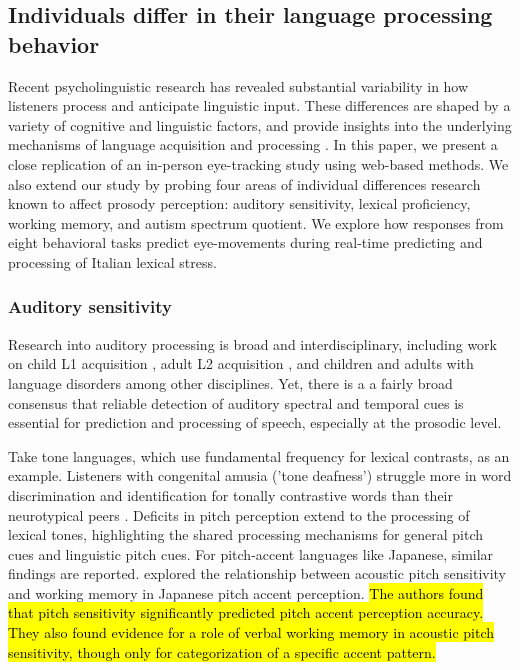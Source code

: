 \subsection{Individuals differ in their language processing behavior}

Recent psycholinguistic research has revealed substantial variability in how listeners process and anticipate linguistic input. These differences are shaped by a variety of cognitive and linguistic factors, and provide insights into the underlying mechanisms of language acquisition and processing \citep{Huettig2016, Li2023, Kidd2018}. In this paper, we present a close replication of an in-person eye-tracking study using web-based methods. We also extend our study by probing four areas of individual differences research known to affect prosody perception: auditory sensitivity, lexical proficiency, working memory, and autism spectrum quotient. We explore how responses from eight behavioral tasks predict eye-movements during real-time predicting and processing of Italian lexical stress.


\subsubsection{Auditory sensitivity}
Research into auditory processing is broad and interdisciplinary, including work on child L1 acquisition \citep{benasich2002infant}, adult L2 acquisition \citep{lengeris2010effect, kempe2012individual}, and children and adults with language disorders \citep{Liu2018, goswami2013impaired} among other disciplines. Yet, there is a a fairly broad consensus that reliable detection of auditory spectral and temporal cues is essential for prediction and processing of speech, especially at the prosodic level. 

Take tone languages, which use fundamental frequency for lexical contrasts, as an example. Listeners with congenital amusia ('tone deafness') struggle more in word discrimination and identification for tonally contrastive words than their neurotypical peers \citep{nan_2010, zhu2023tone}. Deficits in pitch perception extend to the processing of lexical tones, highlighting the shared processing mechanisms for general pitch cues and linguistic pitch cues. For pitch-accent languages like Japanese, similar findings are reported. \cite{goss_2014} explored the relationship between acoustic pitch sensitivity and working memory in Japanese pitch accent perception. \hl{The authors found that pitch sensitivity significantly predicted pitch accent perception accuracy. They also found evidence for a role of verbal working memory in acoustic pitch sensitivity, though only for categorization of a specific accent pattern.}


